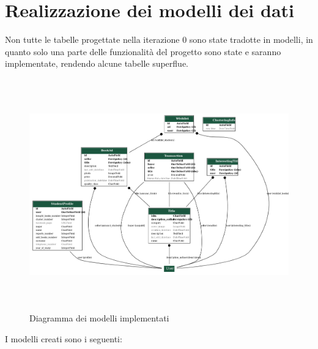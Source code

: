 \documentclass[10pt,a4paper]{report}
\begin{document}
	\section{Realizzazione dei modelli dei dati}
	Non tutte le tabelle progettate nella iterazione 0 sono state tradotte in modelli, in quanto solo una parte delle funzionalità del progetto sono state e saranno implementate, rendendo alcune tabelle superflue. 
	\begin{figure}[H]
		\centering
		\includegraphics[height=10cm, width=17cm, keepaspectratio]{images/models.png}
		\caption{Diagramma dei modelli implementati}
	\end{figure}
	I modelli creati sono i seguenti:
\end{document}
